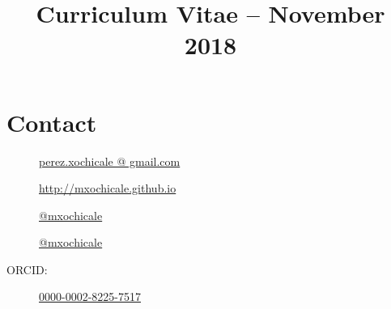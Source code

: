 \documentclass[10pt,a4paper,roman]{moderncv}
\title{Curriculum Vitae -- November 2018}
\begin{document}
%
%
\makecvtitle



%


\vspace{-15mm}


\section{Contact}
%

\begin{changemargin}{2.4cm}{0.5cm}
  \begin{minipage}{.4\textwidth}
    \begin{description}
     \item[\faEnvelope]  \href{perez.xochicale @ gmail.com}{perez.xochicale @ gmail.com}
     \item[\faHome]  \href{http://mxochicale.github.io}{http://mxochicale.github.io}
     \end{description}
  \end{minipage}
  \begin{minipage}{.4\textwidth}
  \begin{description}
   \item[\faTwitter ] \href{https://twitter.com/_mxochicale}{@\textunderscore mxochicale}
   \item[\faGithub]  \href{https://github.com/mxochicale}{@mxochicale}
   \item[ORCID:] \href{http://orcid.org/0000-0002-8225-7517}{0000-0002-8225-7517}
   \end{description}
  \end{minipage}
\end{changemargin}
\end{document}
